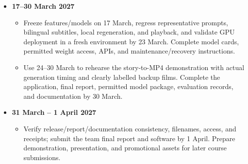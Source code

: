 \documentclass[a4paper,12pt]{article}
\begin{document}
\begin{itemize}
  \item \textbf{17--30 March 2027}
    \begin{itemize}
      \item Freeze features/models on 17 March, regress representative prompts, bilingual subtitles, local regeneration, and playback, and validate GPU deployment in a fresh environment by 23 March. Complete model cards, permitted weight access, APIs, and maintenance/recovery instructions.
      \item Use 24--30 March to rehearse the story-to-MP4 demonstration with actual generation timing and clearly labelled backup films. Complete the application, final report, permitted model package, evaluation records, and documentation by 30 March.
    \end{itemize}

  \item \textbf{31 March -- 1 April 2027}
    \begin{itemize}
      \item Verify release/report/documentation consistency, filenames, access, and receipts; submit the team final report and software by 1 April. Prepare demonstration, presentation, and promotional assets for later course submissions.
    \end{itemize}

\end{itemize}

\clearpage
\end{document}
